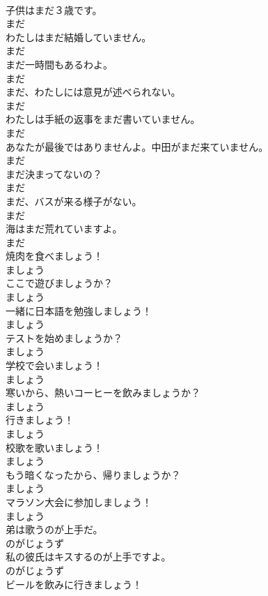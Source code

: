 \documentclass[8pt]{extreport}
\begin{document}
\begin{CJK}{UTF8}{min}
\\	子供はまだ３歳です。	
\\	まだ
\\	わたしはまだ結婚していません。	
\\	まだ
\\	まだ一時間もあるわよ。	
\\	まだ
\\	まだ、わたしには意見が述べられない。	
\\	まだ
\\	わたしは手紙の返事をまだ書いていません。	
\\	まだ
\\	あなたが最後ではありませんよ。中田がまだ来ていません。	
\\	まだ
\\	まだ決まってないの？	
\\	まだ
\\	まだ、バスが来る様子がない。	
\\	まだ
\\	海はまだ荒れていますよ。	
\\	まだ
\\	焼肉を食べましょう！	
\\	ましょう
\\	ここで遊びましょうか？	
\\	ましょう
\\	一緒に日本語を勉強しましょう！	
\\	ましょう
\\	テストを始めましょうか？	
\\	ましょう
\\	学校で会いましょう！	
\\	ましょう
\\	寒いから、熱いコーヒーを飲みましょうか？	
\\	ましょう
\\	行きましょう！	
\\	ましょう
\\	校歌を歌いましょう！	
\\	ましょう
\\	もう暗くなったから、帰りましょうか？	
\\	ましょう
\\	マラソン大会に参加しましょう！	
\\	ましょう
\\	弟は歌うのが上手だ。	
\\	のがじょうず
\\	私の彼氏はキスするのが上手ですよ。	
\\	のがじょうず
\\	ビールを飲みに行きましょう！	

\end{CJK}
\end{document}

